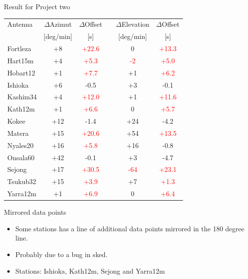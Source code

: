 \documentclass{beamer}
\begin{document}
    \begin{frame}{Result for Project two}
        \begin{tabular}{l c c c c c}
            Antenna & $\Delta$Azimut & $\Delta$Offset & & $\Delta$Elevation & $\Delta$Offset\\ [-8pt]
               & \tiny{[deg/min]}      & \tiny{[s]}            & & \tiny{[deg/min]} & \tiny{[s]} \\
            \hline
            Fortleza          & +8  & \textcolor{red}{+22.6} &  & 0  &\textcolor{red}{+13.3}  \\
            Hart15m           & +4  & \textcolor{red}{+5.3}  &  & \textcolor{red}{-2} &\textcolor{red}{+5.0}   \\
            Hobart12          & +1  & \textcolor{red}{+7.7}  &  & +1&\textcolor{red}{+6.2}   \\
            Ishioka           & +6  & -0.5  &  & +3 & -0.1   \\
            Kashim34          & +4  & \textcolor{red}{+12.0} &  & +1 &\textcolor{red}{+11.6}  \\
            Kath12m           & +1  & \textcolor{red}{+6.6}  &  & 0 &\textcolor{red}{+5.7}   \\
            Kokee             & +12 & -1.4  &  & +24&-4.2   \\
            Matera            & +15 & \textcolor{red}{+20.6} &  & +54&\textcolor{red}{+13.5}  \\
            Nyales20          & +16 & \textcolor{red}{+5.8}  &  & +16& -0.8  \\
            Onsala60          & +42 & -0.1  &  & +3 &-4.7   \\
            Sejong            & +17 & \textcolor{red}{+30.5} &  &\textcolor{red}{-64}& \textcolor{red}{+23.1}  \\
            Tsukub32          & +15 & \textcolor{red}{+3.9}  &  & +7 &\textcolor{red}{+1.3}   \\
            Yarra12m          & +1  & \textcolor{red}{+6.9}  &  & 0  &\textcolor{red}{+6.4}   \\
        \end{tabular}
    \end{frame}
    \begin{frame}{Mirrored data points}
        \begin{itemize}[<+-|alert@+>]
            \item Some stations has a line of additional data points mirrored
            in the 180 degree line.
            \item Probably due to a bug in sked.
            \item Stations: Ishioka, Kath12m, Sejong and Yarra12m
        \end{itemize}
    \end{frame}
\end{document}
